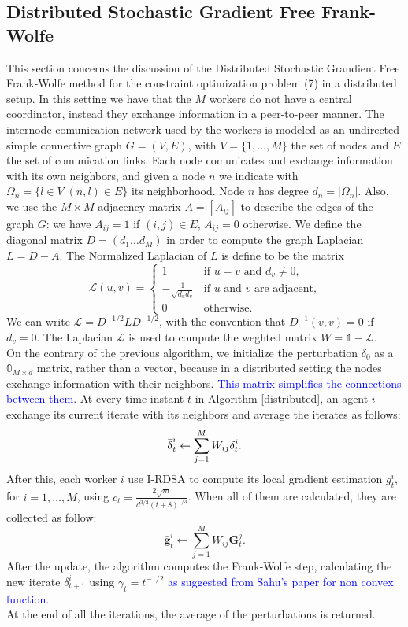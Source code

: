 \subsection{Distributed Stochastic Gradient Free Frank-Wolfe}
This section concerns the discussion of the Distributed Stochastic Grandient Free Frank-Wolfe method for the constraint optimization problem (7) in a distributed setup. In this setting we have that the $M$ workers do not have a central coordinator, instead they exchange information in a peer-to-peer manner. The internode comunication network used by the workers is modeled as an undirected simple connective graph $G=(V,E)$, with $V=\{1, \dots, M\}$ the set of nodes and $E$ the set of comunication links. Each node comunicates and exchange information with its own neighbors, and given a node $n$ we indicate with $\Omega_n = \{l \in V | (n,l)\in E\}$ its neighborhood. Node $n$ has degree $d_n = |\Omega_n|$. Also, we use the $M \times M$ adjacency matrix $A=[A_{ij}]$ to describe the edges of the graph $G$: we have $A_{ij}=1$ if $(i,j) \in E$, $A_{ij}=0$ otherwise. We define the diagonal matrix $D=(d_1 \dots d_M)$ in order to compute the graph Laplacian $L=D-A$. The Normalized Laplacian of $L$ is define to be the matrix
\[
\mathcal{L}(u,v)=
\begin{cases}
	1 & \text{if $u=v$ and }d_v\ne0, \\
	-\frac{1}{\sqrt{d_ud_v}} & \text{if $u$ and $v$ are adjacent,}\\
	0 & \text{otherwise.}
	
\end{cases}
\]
We can write $\mathcal{L} = D^{-1/2}LD^{-1/2}$, with the convention that $D^{-1}(v,v) = 0$ if $d_v=0$. The Laplacian $\mathcal{L}$ is used to compute the weghted matrix $W = \mathbb{1}- \mathcal{L}$.\\
On the contrary of the previous algorithm, we initialize the perturbation \boldmath$\delta_0$ as a $\mathbb{0}_{M \times d}$ matrix, rather than a vector, because in a distributed setting the nodes exchange information with their neighbors. \textcolor{blue}{This matrix simplifies the connections between them}. At every time instant $t$ in Algorithm \ref{distributed}, an agent $i$ exchange its current iterate with its neighbors and average the iterates as follows:
\[\bar{\text{\boldmath}\delta}_t^i \leftarrow \sum_{j=1}^{M} W_{ij}\text{\boldmath}\delta_t^i.\]
After this, each worker $i$ use I-RDSA to compute its local gradient estimation $g_t^i$, for $i= 1, \dots, M$, using $c_t = \frac{2\sqrt{m}}{d^{3/2}(t+8)^{1/3}}$. When all of them are calculated, they are collected as follow:
\[ \bar{\mathbf{g}}_t^i \leftarrow \sum_{j=1}^{M} W_{ij}\mathbf{G}_t^j.\]
After the update, the algorithm computes the Frank-Wolfe step, calculating the new iterate \boldmath$\delta_{t+1}^i$ using $\gamma_t= t^{-1/2}$ \textcolor{blue}{as suggested from Sahu's paper for non convex function}.\\
At the end of all the iterations, the average of the perturbations is returned.\\

